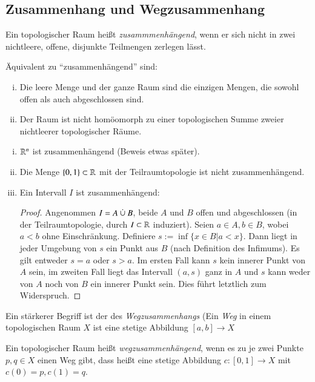 \documentclass[a4paper,10pt]{scrartcl}
\begin{document}
\subsection{Zusammenhang und Wegzusammenhang}
\begin{df}
Ein topologischer Raum heißt \emph{zusammmenhängend}, wenn er sich nicht in zwei nichtleere, offene, disjunkte Teilmengen zerlegen lässt.
\end{df}
\begin{figure}[H]
\centering
 \fixme[fig19]
\caption{}
\end{figure}
\begin{note*}
Äquivalent zu "`zusammenhängend"' sind:
\begin{enumerate}[(i)]
\item Die leere Menge und der ganze Raum sind die einzigen Mengen, die sowohl offen als auch abgeschlossen sind.
\item Der Raum ist nicht homöomorph zu einer topologischen Summe zweier nichtleerer topologischer Räume.
\end{enumerate}
\end{note*}
\begin{exs*}
\begin{enumerate}[(i)]
\item $ \mathbb{R}^n $ ist zusammenhängend (Beweis etwas später).
\item Die Menge $ \{0,1\} \subset \mathbb{R}$ mit der Teilraumtopologie ist nicht zusammenhängend.
\item Ein Intervall $ I $ ist zusammenhängend: 
\begin{proof}
Angenommen $I=A\mathbin{\dot{\cup}} B$, beide $ A $ und $ B $ offen und abgeschlossen (in der Teilraumtopologie, durch $ I\subset \mathbb{R} $ induziert). Seien $ a\in A, b\in B $, wobei $ a<b $ ohne Einschränkung. Definiere $ s:=\inf\{x\in B|a<x\}$. Dann liegt in jeder Umgebung von $ s $ ein Punkt aus $ B $ (nach Definition des Infimums). Es gilt entweder $ s=a $ oder $ s>a $. Im ersten Fall kann $ s $ kein innerer Punkt von $ A $ sein, im zweiten Fall liegt das Intervall $ (a,s) $ ganz in $ A $ und $ s $ kann weder von $ A $ noch von $ B $ ein innerer Punkt sein. Dies führt letztlich zum Widerspruch.
\end{proof}
\end{enumerate}
\end{exs*}
Ein stärkerer Begriff ist der des \emph{Wegzusammenhangs} (Ein \emph{Weg} in einem topologischen Raum $ X $ ist eine stetige Abbildung $ [a,b]\to X $
\begin{df}
Ein topologischer Raum heißt \emph{wegzusammenhängend}, wenn es zu je zwei Punkte $ p,q\in X $ einen Weg gibt, dass heißt eine stetige Abbildung $ c: [0,1]\to X $ mit $c(0)=p, c(1)=q$.
\end{df}
\end{document}
